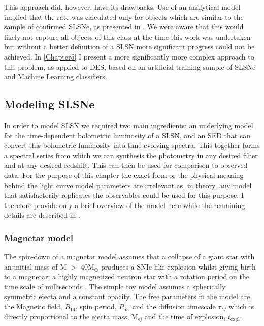 This approach did, however, have its drawbacks. Use of an analytical model implied that the rate was calculated only for objects which are similar to the sample of confirmed SLSNe, as presented in . We were aware that this would likely not capture all objects of this class at the time this work was undertaken but without a better definition of a SLSN more significant progress could not be achieved. In \cref{Chapter5} I present a more significantly more complex approach to this problem, as applied to DES, based on an artificial training sample of SLSNe and Machine Learning classifiers.

\subsection{Modeling SLSNe}
In order to model SLSN we required two main ingredients: an underlying model for the time-dependent bolometric luminosity of a SLSN, and an SED that can convert this bolometric luminosity into time-evolving spectra. This together forms a spectral series from which we can synthesis the photometry in any desired filter and at any desired redshift. This can then be used for comparison to observed data. For the purpose of this chapter the exact form or the physical meaning behind the light curve model parameters are irrelevant as, in theory, any model that satisfactorily replicates the observables could be used for this purpose. I therefore provide only a brief overview of the model here while the remaining details are described in .

\subsubsection{Magnetar model}
The spin-down of a magnetar model assumes that a collapse of a giant star with an initial mass of M $>$ 40M$_{\odot}$ produces a SNIc like explosion whilst giving birth to a magnetar; a highly magnetized neutron star with a rotation period on the time scale of milliseconds \citep{Kasen2009,Woosley2010,Inserra2013}. The simple toy model assumes a spherically symmetric ejecta and a constant opacity. The free parameters in the model are the Magnetic field, $B_{14}$, spin period, $P_{\mathrm{ms}}$ and the diffusion timescale $\tau_M$ which is directly proportional to the ejecta mass, M$_{\mathrm{ej}}$ and the time of explosion, $t_{\mathrm{expl}}$.


